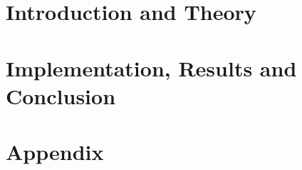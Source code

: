 \documentclass[11pt,a4paper,bibtotoc,idxtotoc,headsepline,footsepline,footexclude,BCOR12mm,DIV13]{scrbook}
\begin{document}
	\frontmatter
	
	
	
	
	
	
	
	
	
	
	

	\tableofcontents

	
  
  

	\mainmatter
	
	
		\part[Part One: Introduction and Theory]{Introduction and Theory}
		\label{firstpart}
		
		
		
		
		
		
		
		
		\part[Part Two: Implementation, Results and Conclusion]{Implementation, Results and Conclusion}
		\label{secondpart}
		
		
		
		
		
		
		\part*{Appendix}
		
		\appendix %
		
		
		
	


  \clearemptydoublepage
  
	
	
	
 
\end{document}
